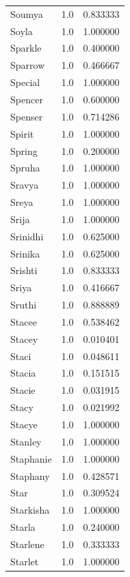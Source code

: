 \documentclass[
  letterpaper,
  DIV=11,
  numbers=noendperiod]{scrreprt}
\begin{document}
\begin{tabular}{lrr}
Soumya          &   1.0 &   0.833333 \\
Soyla           &   1.0 &   1.000000 \\
Sparkle         &   1.0 &   0.400000 \\
Sparrow         &   1.0 &   0.466667 \\
Special         &   1.0 &   1.000000 \\
Spencer         &   1.0 &   0.600000 \\
Spenser         &   1.0 &   0.714286 \\
Spirit          &   1.0 &   1.000000 \\
Spring          &   1.0 &   0.200000 \\
Spruha          &   1.0 &   1.000000 \\
Sravya          &   1.0 &   1.000000 \\
Sreya           &   1.0 &   1.000000 \\
Srija           &   1.0 &   1.000000 \\
Srinidhi        &   1.0 &   0.625000 \\
Srinika         &   1.0 &   0.625000 \\
Srishti         &   1.0 &   0.833333 \\
Sriya           &   1.0 &   0.416667 \\
Sruthi          &   1.0 &   0.888889 \\
Stacee          &   1.0 &   0.538462 \\
Stacey          &   1.0 &   0.010401 \\
Staci           &   1.0 &   0.048611 \\
Stacia          &   1.0 &   0.151515 \\
Stacie          &   1.0 &   0.031915 \\
Stacy           &   1.0 &   0.021992 \\
Stacye          &   1.0 &   1.000000 \\
Stanley         &   1.0 &   1.000000 \\
Staphanie       &   1.0 &   1.000000 \\
Staphany        &   1.0 &   0.428571 \\
Star            &   1.0 &   0.309524 \\
Starkisha       &   1.0 &   1.000000 \\
Starla          &   1.0 &   0.240000 \\
Starlene        &   1.0 &   0.333333 \\
Starlet         &   1.0 &   1.000000 \\

\end{tabular}
\end{document}
